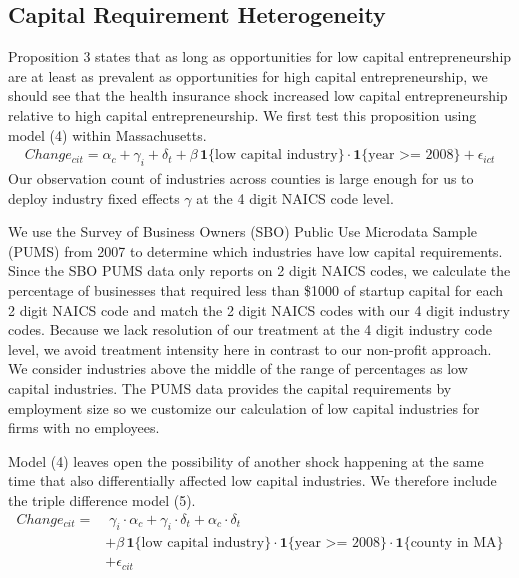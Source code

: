 \documentclass[12pt]{article}
\begin{document}
\subsection{Capital Requirement Heterogeneity}

Proposition 3 states that as long as opportunities for low capital entrepreneurship are at least as prevalent as opportunities for high capital entrepreneurship, we should see that the health insurance shock increased low capital entrepreneurship relative to high capital entrepreneurship. We first test this proposition using model (4) within Massachusetts. 
\begin{align}
Change_{cit} =  \alpha_c + \gamma_i+ \delta_t + \beta \, \mathbf{1}\{\text{low capital industry}\} \cdot \mathbf{1}\{\text{year >= 2008}\} + \epsilon_{ict}
\end{align}
Our observation count of industries across counties is large enough for us to deploy industry fixed effects $\gamma$ at the 4 digit NAICS code level. 

We use the Survey of Business Owners (SBO) Public Use Microdata Sample (PUMS) from 2007 to determine which industries have low capital requirements. Since the SBO PUMS data only reports on 2 digit NAICS codes, we calculate the percentage of businesses that required less than \$1000 of startup capital for each 2 digit NAICS code and match the 2 digit NAICS codes with our 4 digit industry codes. Because we lack resolution of our treatment at the 4 digit industry code level, we avoid treatment intensity here in contrast to our non-profit approach. We consider industries above the middle of the range of percentages as low capital industries. The PUMS data provides the capital requirements by employment size so we customize our calculation of low capital industries for firms with no employees. 

Model (4) leaves open the possibility of another shock happening at the same time that also differentially affected low capital industries. We therefore include the triple difference model (5). 
\begin{align}
Change_{cit} = & \; \gamma_i \cdot \alpha_c + \gamma_i \cdot \delta_t +  \alpha_c \cdot \delta_t \nonumber   \\
& + \beta \, \mathbf{1}\{\text{low capital industry}\} \cdot \mathbf{1}\{\text{year >= 2008}\}  \cdot \mathbf{1}\{\text{county in MA}\} \nonumber  \\
& + \epsilon_{cit}
\end{align}
\end{document}
